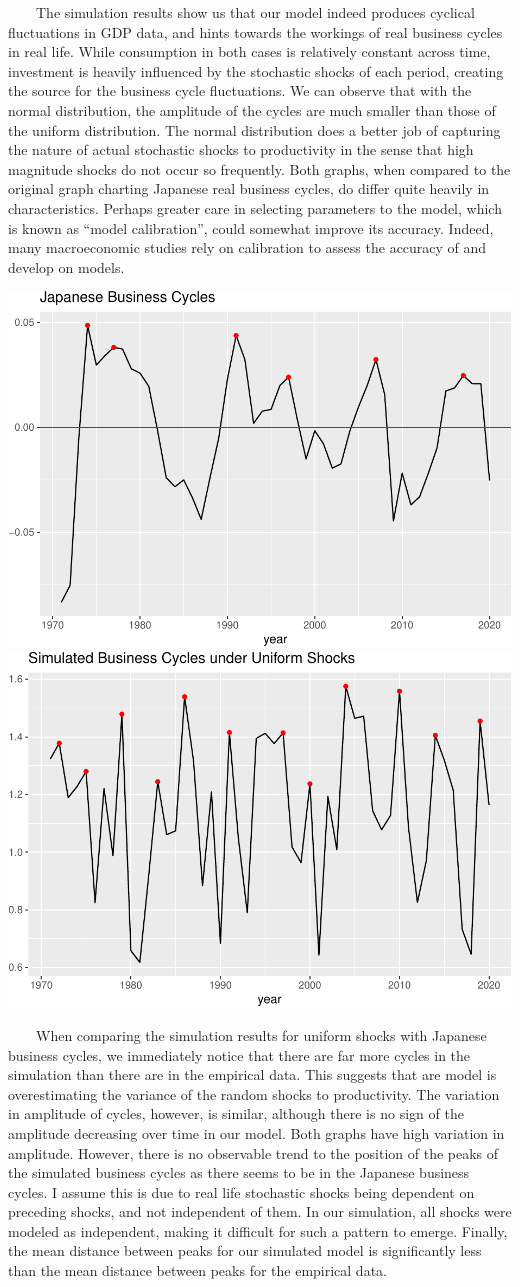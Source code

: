 \documentclass[
]{article}
\begin{document}
~~~~The simulation results show us that our model indeed produces
cyclical fluctuations in GDP data, and hints towards the workings of
real business cycles in real life. While consumption in both cases is
relatively constant across time, investment is heavily influenced by the
stochastic shocks of each period, creating the source for the business
cycle fluctuations. We can observe that with the normal distribution,
the amplitude of the cycles are much smaller than those of the uniform
distribution. The normal distribution does a better job of capturing the
nature of actual stochastic shocks to productivity in the sense that
high magnitude shocks do not occur so frequently. Both graphs, when
compared to the original graph charting Japanese real business cycles,
do differ quite heavily in characteristics. Perhaps greater care in
selecting parameters to the model, which is known as ``model
calibration'', could somewhat improve its accuracy. Indeed, many
macroeconomic studies rely on calibration to assess the accuracy of and
develop on models.

\includegraphics[width=0.5\linewidth]{rbc_report_files/figure-latex/unnamed-chunk-5-1}
\includegraphics[width=0.5\linewidth]{rbc_report_files/figure-latex/unnamed-chunk-5-2}

~~~~When comparing the simulation results for uniform shocks with
Japanese business cycles, we immediately notice that there are far more
cycles in the simulation than there are in the empirical data. This
suggests that are model is overestimating the variance of the random
shocks to productivity. The variation in amplitude of cycles, however,
is similar, although there is no sign of the amplitude decreasing over
time in our model. Both graphs have high variation in amplitude.
However, there is no observable trend to the position of the peaks of
the simulated business cycles as there seems to be in the Japanese
business cycles. I assume this is due to real life stochastic shocks
being dependent on preceding shocks, and not independent of them. In our
simulation, all shocks were modeled as independent, making it difficult
for such a pattern to emerge. Finally, the mean distance between peaks
for our simulated model is significantly less than the mean distance
between peaks for the empirical data.
\end{document}

